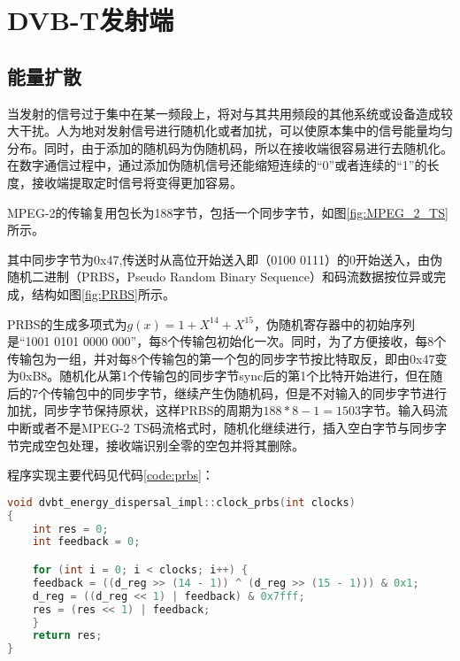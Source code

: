 \chapter{DVB-T发射端}
	\section{能量扩散}
		\par 当发射的信号过于集中在某一频段上，将对与其共用频段的其他系统或设备造成较大干扰。人为地对发射信号进行随机化或者加扰，可以使原本集中的信号能量均匀分布。同时，由于添加的随机码为伪随机码，所以在接收端很容易进行去随机化。在数字通信过程中，通过添加伪随机信号还能缩短连续的“0”或者连续的“1”的长度，接收端提取定时信号将变得更加容易。\cite{数字电视DVB标准能量扩散的FPGA设计与实现_肖闽进}
		\par MPEG-2的传输复用包长为188字节，包括一个同步字节，如图\ref{fig:MPEG_2_TS}所示。		
		\par 其中同步字节为0x47,传送时从高位开始送入即（0100 0111）的0开始送入，由伪随机二进制（PRBS，Pseudo Random Binary Sequence）和码流数据按位异或完成，结构如图\ref{fig:PRBS}所示。
		
		\par PRBS的生成多项式为$g(x)=1+X^{14}+X^{15}$，伪随机寄存器中的初始序列是“1001 0101 0000 000”，每8个传输包初始化一次。同时，为了方便接收，每8个传输包为一组，并对每8个传输包的第一个包的同步字节按比特取反，即由0x47变为0xB8。随机化从第1个传输包的同步字节sync后的第1个比特开始进行，但在随后的7个传输包中的同步字节，继续产生伪随机码，但是不对输入的同步字节进行加扰，同步字节保持原状，这样PRBS的周期为$188*8-1=1503$字节。输入码流中断或者不是MPEG-2 TS码流格式时，随机化继续进行，插入空白字节与同步字节完成空包处理，接收端识别全零的空包并将其删除。
		\par 程序实现主要代码见代码\ref{code:prbs}：
		\begin{lstlisting}[caption = {能量扩散}, label = {code:prbs}, language = C++ ]
void dvbt_energy_dispersal_impl::clock_prbs(int clocks)
{
	int res = 0;
	int feedback = 0;

	for (int i = 0; i < clocks; i++) {
	feedback = ((d_reg >> (14 - 1)) ^ (d_reg >> (15 - 1))) & 0x1;
	d_reg = ((d_reg << 1) | feedback) & 0x7fff;
	res = (res << 1) | feedback;
	}
	return res;
}
		\end{lstlisting}
